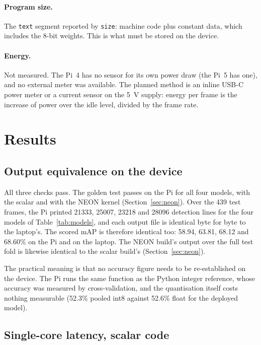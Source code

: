 \documentclass[11pt,a4paper]{article}
\begin{document}
\paragraph{Program size.} The \texttt{text} segment reported by
\texttt{size}: machine code plus constant data, which includes the 8-bit
weights. This is what must be stored on the device.

\paragraph{Energy.} Not measured. The Pi~4 has no sensor for its own power
draw (the Pi~5 has one), and no external meter was available. The planned
method is an inline USB-C power meter or a current sensor on the
\SI{5}{V} supply: energy per frame is the increase of power over the idle
level, divided by the frame rate.

\section{Results}
\label{sec:results}

\subsection{Output equivalence on the device}

All three checks pass. The golden test passes on the Pi for all four models,
with the scalar and with the NEON kernel (Section~\ref{sec:neon}). Over the
439 test frames, the Pi printed \num{21333}, \num{25007}, \num{23218} and
\num{28096} detection lines for the four models of Table~\ref{tab:models},
and each output file is identical byte for byte to the laptop's. The scored
mAP is therefore identical too: 58.94, 63.81, 68.12 and 68.60\% on the Pi
and on the laptop. The NEON build's output over the full test fold is likewise
identical to the scalar build's (Section~\ref{sec:neon}).

The practical meaning is that no accuracy figure needs to be re-established
on the device. The Pi runs the same function as the Python integer
reference, whose accuracy was measured by cross-validation, and the
quantisation itself costs nothing measurable (52.3\% pooled int8 against
52.6\% float for the deployed model).

\subsection{Single-core latency, scalar code}
\label{sec:scalar}
\end{document}
